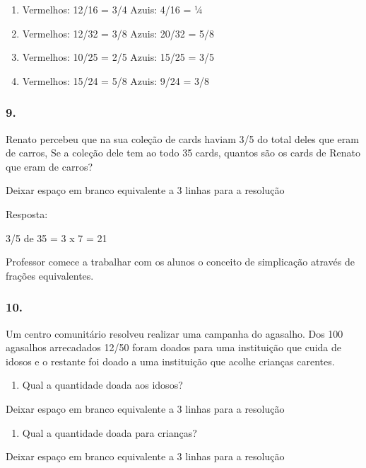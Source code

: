 \begin{enumerate}
\def\labelenumi{\alph{enumi})}
\item
  Vermelhos: 12/16 = 3/4 Azuis: 4/16 = ¼
\item
  Vermelhos: 12/32 = 3/8 Azuis: 20/32 = 5/8
\item
  Vermelhos: 10/25 = 2/5 Azuis: 15/25 = 3/5
\item
  Vermelhos: 15/24 = 5/8 Azuis: 9/24 = 3/8
\end{enumerate}

\subsubsection{9.}\label{section-112}

Renato percebeu que na sua coleção de cards haviam 3/5 do total deles
que eram de carros, Se a coleção dele tem ao todo 35 cards, quantos são
os cards de Renato que eram de carros?

Deixar espaço em branco equivalente a 3 linhas para a resolução

Resposta:

3/5 de 35 = 3 x 7 = 21

Professor comece a trabalhar com os alunos o conceito de simplicação
através de frações equivalentes.

\subsubsection{10.}\label{section-113}

Um centro comunitário resolveu realizar uma campanha do agasalho. Dos
100 agasalhos arrecadados 12/50 foram doados para uma instituição que
cuida de idosos e o restante foi doado a uma instituição que acolhe
crianças carentes.

\begin{enumerate}
\def\labelenumi{\alph{enumi})}
\item
  Qual a quantidade doada aos idosos?
\end{enumerate}

Deixar espaço em branco equivalente a 3 linhas para a resolução

\begin{enumerate}
\def\labelenumi{\alph{enumi})}
\item
  Qual a quantidade doada para crianças?
\end{enumerate}

Deixar espaço em branco equivalente a 3 linhas para a resolução

